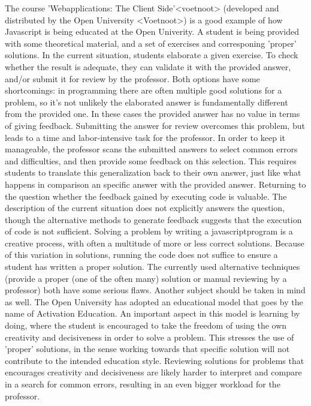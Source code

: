 \documentclass{article}
\begin{document}
\noindent
The course 'Webapplications: The Client Side'<voetnoot> (developed and distributed by the Open University <Voetnoot>) is a good example of how Javascript is being educated at the Open Univerity. A student is being provided with some theoretical material, and a set of exercises and corresponing 'proper' solutions. In the current situation, students elaborate a given exercise. To check whether the result is adequate, they can validate it with the provided answer, and/or submit it for review by the professor. Both options have some shortcomings: in programming there are often multiple good solutions for a problem, so it’s not unlikely the elaborated answer is fundamentally different from the provided one. In these cases the provided answer has no value in terms of giving feedback. Submitting the answer for review overcomes this problem, but leads to a time and labor-intensive task for the professor. In order to keep it manageable, the professor scans the submitted answers to select common errors and difficulties, and then provide some feedback on this selection. This requires students to translate this generalization back to their own answer, just like what happens in comparison an specific answer with the provided answer.
\newline
Returning to the question whether the feedback gained by executing code is valuable. The description of the current situation does not explicitly answers the question, though the alternative methods to generate feedback suggests that the execution of code is not sufficient. Solving a problem by writing a javascriptprogram is a creative process, with often a multitude of more or less correct solutions. Because of this variation in solutions, running the code does not suffice to ensure a student has written a proper solution. The currently used alternative techniques (provide a proper (one of the often many) solution or manual reviewing by a professor) both have some serious flaws. 
\newline
Another subject should be taken in mind as well. The Open University has adopted an educational model that goes by the name of Activation Education. An important aspect in this model is learning by doing, where the student is encouraged to take the freedom of using the own creativity and decisiveness in order to solve a problem. This stresses the use of 'proper' solutions, in the sense working towards that specific solution will not contribute to the intended education style. Reviewing solutions for problems that encourages creativity and decisiveness are likely harder to interpret and compare in a search for common errors, resulting in an even bigger workload for the professor. 
\end{document}

